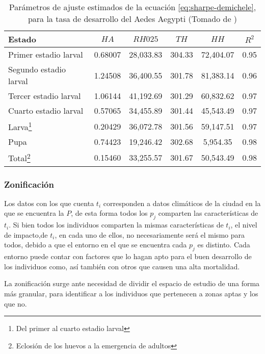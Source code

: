 \begin{table}
\begin{minipage}{\paperwidth}
\begin{tabular}{p{6cm} c c c c c }
Estado                     & $HA$    & $RH025$   & $TH$   & $HH$      & $R^2$   \\
\hline
Primer estadio larval      & 0.68007 & 28,033.83 & 304.33 & 72,404.07 & 0.95 \\
Segundo estadio larval     & 1.24508 & 36,400.55 & 301.78 & 81,383.14 & 0.96 \\
Tercer estadio larval      & 1.06144 & 41,192.69 & 301.29 & 60,832.62 & 0.97 \\
Cuarto estadio larval      & 0.57065 & 34,455.89 & 301.44 & 45,543.49 & 0.97 \\
Larva\footnote{Del primer al cuarto estadio larval} & 0.20429 & 36,072.78 & 301.56 & 59,147.51 & 0.97 \\
Pupa                       & 0.74423 & 19,246.42 & 302.68 & 5,954.35 & 0.98  \\
Total\footnote{Eclosión de los huevos a la emergencia de adultos}& 0.15460 & 33,255.57 & 301.67 & 50,543.49 & 0.98 \\

\end{tabular}
\end{minipage}
\caption{ \label{tab:tasa-desarrollo} Parámetros de ajuste estimados de la ecuación \eqref{eq:sharpe-demichele}, 
para la tasa de desarrollo del Aedes Aegypti (Tomado de \cite{rueda1990temperature})}
 
\end{table}

\subsubsection{Zonificación}
Los datos con los que cuenta $t_{i}$ corresponden a datos climáticos de la ciudad en la que se encuentra la
$P$, de esta forma todos los $p_{j}$ comparten las características de $t_{i}$. Si bien todos los individuos
comparten la mismas características de $t_{i}$, el nivel de impacto,de $t_{i}$, en cada uno de ellos, no
necesariamente será el mismo para todos, debido a que el entorno en el que se encuentra cada $p_{j}$ es 
distinto. Cada entorno puede contar con factores que lo hagan apto para el buen desarrollo de los individuos
como, así también con otros que causen una alta mortalidad.

La zonificación surge ante necesidad de dividir el espacio de estudio de una forma más granular, para identificar
a los individuos que pertenecen a zonas aptas y los que no.

